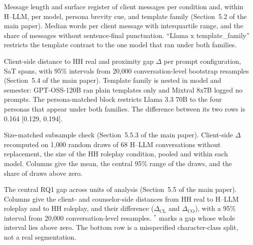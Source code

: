 \documentclass[fleqn,10pt]{JLA_article}
\newcommand{\fitwidth}[1]{\resizebox{\ifdim\width>\linewidth \linewidth\else \width\fi}{!}{#1}}
\newcommand{\dCL}{\Delta_{\mathrm{CL}}}
\newcommand{\dCO}{\Delta_{\mathrm{CO}}}
\begin{document}
\begin{table}[t]
\caption{Message length and surface register of client messages per condition and, within H--LLM, per model, persona brevity cue, and template family (Section~5.2 of the main paper). Median words per client message with interquartile range, and the share of messages without sentence-final punctuation. ``Llama x template\_family'' restricts the template contrast to the one model that ran under both families.}
\label{Stab:verbosity}
\centering
\footnotesize
\setlength{\tabcolsep}{4pt}
\fitwidth{}
\end{table}

\begin{table}[t]
\caption{Client-side distance to HH real and proximity gap $\Delta$ per prompt configuration, SaT spans, with 95\% intervals from 20{,}000 conversation-level bootstrap resamples (Section~5.4 of the main paper). Template family is nested in model and semester: GPT-OSS-120B ran plain templates only and Mixtral 8x7B logged no prompts. The persona-matched block restricts Llama 3.3 70B to the four personas that appear under both families. The difference between its two rows is 0.164 [0.129, 0.194].}
\label{Stab:prompt-variants}
\centering
\footnotesize
\setlength{\tabcolsep}{4pt}
\fitwidth{}
\end{table}

\begin{table}[t]
\caption{Size-matched subsample check (Section~5.5.3 of the main paper). Client-side $\Delta$ recomputed on 1{,}000 random draws of 68 H--LLM conversations without replacement, the size of the HH roleplay condition, pooled and within each model. Columns give the mean, the central 95\% range of the draws, and the share of draws above zero.}
\label{Stab:sizematched}
\centering
\footnotesize
\setlength{\tabcolsep}{4pt}
\fitwidth{}
\end{table}

\begin{table}[t]
\caption{The central RQ1 gap across units of analysis (Section~5.5 of the main paper).
Columns give the client- and counselor-side distances from HH real to H--LLM roleplay and to HH roleplay, and their difference ($\dCL$ and $\dCO$), with a 95\% interval from 20{,}000 conversation-level resamples. $^{*}$ marks a gap whose whole interval lies above zero.
The bottom row is a misspecified character-class split, not a real segmentation.}
\label{Stab:unit-ablation}
\centering
\footnotesize
\setlength{\tabcolsep}{4pt}
\fitwidth{}
\end{table}
\end{document}

